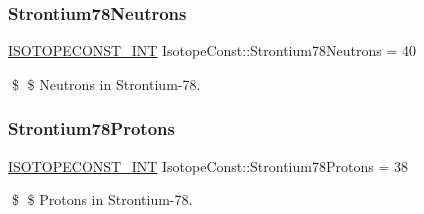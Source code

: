 \subsubsection{\texorpdfstring{Strontium78\+Neutrons}{Strontium78Neutrons}}
{\footnotesize\ttfamily \mbox{\hyperlink{group___isotope_const-_macros_ga5f18360b3e99483a35c32d789e62621c}{I\+S\+O\+T\+O\+P\+E\+C\+O\+N\+S\+T\+\_\+\+I\+NT}} Isotope\+Const\+::\+Strontium78\+Neutrons = 40}

\$ \$ Neutrons in Strontium-\/78. \mbox{\label{group___isotope_const-_strontium-_sr78_gae8568f43b8a8438798228ddcd57c8ede}} 
\subsubsection{\texorpdfstring{Strontium78\+Protons}{Strontium78Protons}}
{\footnotesize\ttfamily \mbox{\hyperlink{group___isotope_const-_macros_ga5f18360b3e99483a35c32d789e62621c}{I\+S\+O\+T\+O\+P\+E\+C\+O\+N\+S\+T\+\_\+\+I\+NT}} Isotope\+Const\+::\+Strontium78\+Protons = 38}

\$ \$ Protons in Strontium-\/78. 